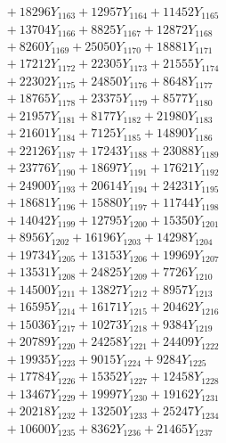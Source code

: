 \documentclass[a4paper,10pt]{article}
\begin{document}
{\begin{align}
&\;  + 18296 Y_{1163} + 12957 Y_{1164} + 11452 Y_{1165} \\[0.3ex]
&\;  + 13704 Y_{1166} + 8825 Y_{1167} + 12872 Y_{1168} \\[0.5ex]\allowbreak
&\;  + 8260 Y_{1169} + 25050 Y_{1170} + 18881 Y_{1171} \\[0.3ex]
&\;  + 17212 Y_{1172} + 22305 Y_{1173} + 21555 Y_{1174} \\[0.3ex]
&\;  + 22302 Y_{1175} + 24850 Y_{1176} + 8648 Y_{1177} \\[0.3ex]
&\;  + 18765 Y_{1178} + 23375 Y_{1179} + 8577 Y_{1180} \\[0.3ex]
&\;  + 21957 Y_{1181} + 8177 Y_{1182} + 21980 Y_{1183} \\[0.3ex]
&\;  + 21601 Y_{1184} + 7125 Y_{1185} + 14890 Y_{1186} \\[0.3ex]
&\;  + 22126 Y_{1187} + 17243 Y_{1188} + 23088 Y_{1189} \\[0.3ex]
&\;  + 23776 Y_{1190} + 18697 Y_{1191} + 17621 Y_{1192} \\[0.3ex]
&\;  + 24900 Y_{1193} + 20614 Y_{1194} + 24231 Y_{1195} \\[0.3ex]
&\;  + 18681 Y_{1196} + 15880 Y_{1197} + 11744 Y_{1198} \\[0.5ex]\allowbreak
&\;  + 14042 Y_{1199} + 12795 Y_{1200} + 15350 Y_{1201} \\[0.3ex]
&\;  + 8956 Y_{1202} + 16196 Y_{1203} + 14298 Y_{1204} \\[0.3ex]
&\;  + 19734 Y_{1205} + 13153 Y_{1206} + 19969 Y_{1207} \\[0.3ex]
&\;  + 13531 Y_{1208} + 24825 Y_{1209} + 7726 Y_{1210} \\[0.3ex]
&\;  + 14500 Y_{1211} + 13827 Y_{1212} + 8957 Y_{1213} \\[0.3ex]
&\;  + 16595 Y_{1214} + 16171 Y_{1215} + 20462 Y_{1216} \\[0.3ex]
&\;  + 15036 Y_{1217} + 10273 Y_{1218} + 9384 Y_{1219} \\[0.3ex]
&\;  + 20789 Y_{1220} + 24258 Y_{1221} + 24409 Y_{1222} \\[0.3ex]
&\;  + 19935 Y_{1223} + 9015 Y_{1224} + 9284 Y_{1225} \\[0.3ex]
&\;  + 17784 Y_{1226} + 15352 Y_{1227} + 12458 Y_{1228} \\[0.5ex]\allowbreak
&\;  + 13467 Y_{1229} + 19997 Y_{1230} + 19162 Y_{1231} \\[0.3ex]
&\;  + 20218 Y_{1232} + 13250 Y_{1233} + 25247 Y_{1234} \\[0.3ex]
&\;  + 10600 Y_{1235} + 8362 Y_{1236} + 21465 Y_{1237} \\[0.3ex]

\end{align}}
\end{document}
